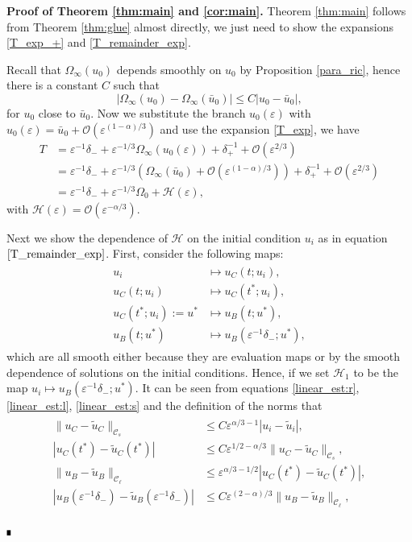 \documentclass[letterpaper,11pt]{article}
\newcommand{\rmO}{\mathcal{O}}
\newcommand{\eps}{\varepsilon}
\numberwithin{equation}{section}
\theoremstyle{plain}
\newenvironment{Proof}[1][.]%
 {\begin{trivlist}\item[]\textbf{Proof#1 }}%
 {\hspace*{\fill}$\rule{0.3\baselineskip}{0.35\baselineskip}$\end{trivlist}}
\begin{document}
\begin{Proof}[\textbf{ of Theorem \ref{thm:main} and \ref{cor:main}}.]
Theorem \ref{thm:main} follows from Theorem \ref{thm:glue} almost directly, we just need to show the expansions \eqref{T_exp_+} and \eqref{T_remainder_exp}. 

Recall that $\Omega_\infty(u_0)$ depends smoothly on $u_0$ by Proposition \ref{para_ric}, hence there is a constant $C$ such that
\[
|\Omega_\infty(u_0) - \Omega_\infty(\bar{u}_0)| \le C|u_0 - \bar{u}_0|,
\]
for $u_0$ close to $\bar{u}_0$. Now we substitute the branch $u_0(\eps)$ with $u_0(\eps)  =\bar{u}_0 + \rmO(\eps^{(1-\alpha)/3})$ and use the expansion \eqref{T_exp}, we have
\begin{align*}
T &= \eps^{-1}\delta_- + \eps^{-1/3}\Omega_\infty(u_0(\eps)) + \delta_+^{-1} + \rmO(\eps^{2/3})\\
&= \eps^{-1}\delta_- + \eps^{-1/3}(\Omega_\infty(\bar{u}_0) + \rmO(\eps^{(1-\alpha)/3}))+\delta_+^{-1} + \rmO(\eps^{2/3}) \\
&= \eps^{-1}\delta_- + \eps^{-1/3}\Omega_0 + \mathcal{H}(\eps),
\end{align*}
with $\mathcal{H}(\eps) = \rmO(\eps^{-\alpha/3})$.

Next we show the dependence of $\mathcal{H}$ on the initial condition $u_i$ as in equation $\eqref{T_remainder_exp}$. First, consider the following maps:
\begin{align*}
\begin{split}
u_i &\mapsto u_C(t;u_i),\\
u_C(t;u_i) &\mapsto u_C(t^*; u_i), \\
u_C(t^*; u_i):= u^* &\mapsto u_B(t; u^*), \\
u_B(t;u^*) &\mapsto u_B(\eps^{-1}\delta_-; u^*),
\end{split}
\end{align*}
which are all smooth either because they are evaluation maps or by the smooth dependence of solutions on the initial conditions. Hence, if we set $\mathcal{H}_1$ to be the map $u_i\mapsto u_B(\eps^{-1}\delta_-;u^*)$. It can be seen from equations \eqref{linear_est:r},\eqref{linear_est:l}, \eqref{linear_est:s} and the definition of the norms that
\begin{align*}
\begin{split}
\|u_C - \tilde{u}_C\|_{\mathcal{C}_s} &\le C\eps^{\alpha/3-1}|u_i -\tilde{u}_i| ,\\
|u_C(t^*) - \tilde{u}_C(t^*)| &\le C\eps^{1/2-\alpha/3}\|u_C - \tilde{u}_C\|_{\mathcal{C}_s}, \\
\|u_B - \tilde{u}_B\|_{\mathcal{C}_\ell} &\le \eps^{\alpha/3-1/2}|u_C(t^*) - \tilde{u}_C(t^*)|, \\
|u_B(\eps^{-1}\delta_-)-\tilde{u}_B(\eps^{-1}\delta_-)| &\le C\eps^{(2-\alpha)/3}\|u_B - \tilde{u}_B\|_{\mathcal{C}_\ell},
\end{split}
\end{align*}


\end{Proof}
\end{document}
